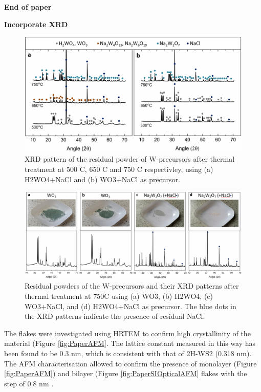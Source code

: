 \documentclass[12pt]{article}
\newcommand{\comment}[1]
{\par {\bfseries \color{blue} #1 \par}} %
\begin{document}
\comment{End of paper}

\comment{Incorporate XRD}
\begin{figure}[h]
\begin{center}
\includegraphics[scale=0.3]{PaperSIXRD.png}
\caption{XRD pattern of the residual powder of W-precursors after thermal treatment at 500 {\degree}C, 650 {\degree}C and 750 {\degree}C respectivley, using (a) H2WO4+NaCl and (b) WO3+NaCl as precursor.}
\label{fig:PaperSIXRD}
\end{center}
\end{figure}

\begin{figure}[h]
\begin{center}
\includegraphics[scale=0.3]{PaperSIXRDOptical.png}
\caption{Residual powders of the W-precursors and their XRD patterns after thermal treatment at 750{\degree}C using (a) WO3, (b) H2WO4, (c) WO3+NaCl, and (d) H2WO4+NaCl as precursor. The blue dots in the XRD patterns indicate the presence of residual NaCl.}
\label{fig:PaperSIXRDOptical}
\end{center}
\end{figure}

The flakes were investigated using HRTEM to confirm high crystallinity of the material (Figure \ref{fig:PaperAFM}. The lattice constant measured in this way has been found to be 0.3 nm, which is consistent with that of 2H-WS2 (0.318 nm). The AFM characterisation allowed to confirm the presence of monolayer (Figure \ref{fig:PaperAFM}) and bilayer (Figure \ref{fig:PaperSIOpticalAFM} flakes with the step of 0.8 nm \cite{Wu2014}\cite{Rasmussen2015}.
\end{document}
